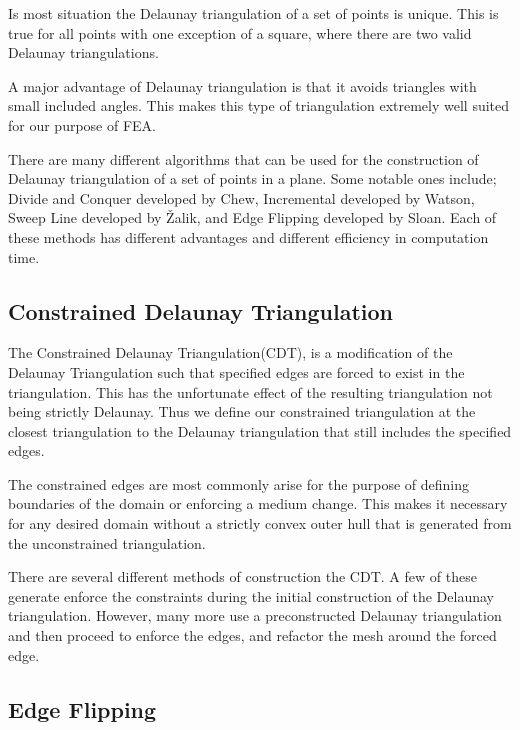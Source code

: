 \documentclass[../fem.tex]{subfiles}
\begin{document}

Is most situation the Delaunay triangulation of a set of points is unique. This
is true for all points with one exception of a square, where there are two
valid Delaunay triangulations.

A major advantage of Delaunay triangulation is that it avoids triangles with
small included angles. This makes this type of triangulation extremely well
suited for our purpose of FEA.

There are many different algorithms that can be used for the construction of
Delaunay triangulation of a set of points in a plane. Some notable ones
include; Divide and Conquer developed by Chew\cite{C_CDT}, Incremental
developed by Watson, Sweep Line developed by \v{Z}alik\cite{Z_DT}\cite{DZ_CDT},
and Edge Flipping developed by Sloan\cite{S_DT}\cite{S_CDT}. Each of these
methods has different advantages and different efficiency in computation time.

\subsection{Constrained Delaunay Triangulation}%
\label{sub:constrained_delaunay_triangulation}

The Constrained Delaunay Triangulation(CDT), is a modification of the Delaunay
Triangulation such that specified edges are forced to exist in the
triangulation. This has the unfortunate effect of the resulting triangulation
not being strictly Delaunay. Thus we define our constrained triangulation at
the closest triangulation to the Delaunay triangulation that still includes the
specified edges.


The constrained edges are most commonly arise for the purpose of defining
boundaries of the domain or enforcing a medium change. This makes it necessary
for any desired domain without a strictly convex outer hull that is generated
from the unconstrained triangulation.

There are several different methods of construction the CDT. A few of these
generate enforce the constraints during the initial construction of the
Delaunay triangulation. However, many more use a preconstructed Delaunay
triangulation and then proceed to enforce the edges, and refactor the mesh
around the forced edge.

\subsection{Edge Flipping}%
\label{sub:edge_flipping}
\end{document}
